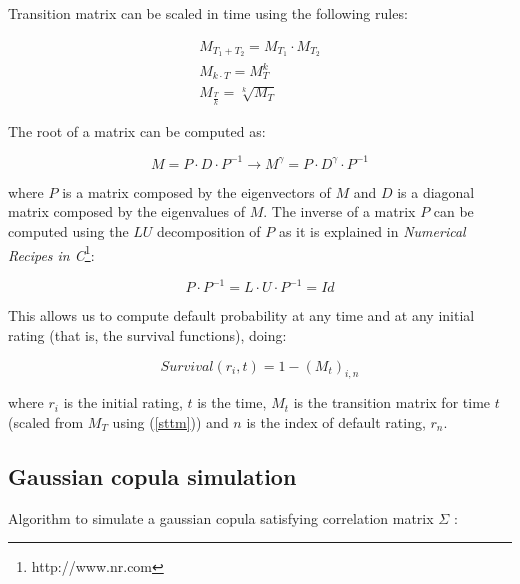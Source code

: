 \documentclass[a4paper,12pt,final]{article}
\begin{document}
Transition matrix can be scaled in time using the following rules:

\begin{equation}
\label{sttm}
\begin{array}{l}
M_{T_1+T_2} = M_{T_1} \cdot M_{T_2} \nonumber \\
M_{k \cdot T} = M_{T}^k \nonumber \\
M_{\frac{T}{k}} = \sqrt[k]{M_{T}} \nonumber
\end{array}
\end{equation}

The root of a matrix can be computed as:

\begin{displaymath}
M = P \cdot D \cdot P^{-1}
\longrightarrow
M^{\gamma} = P \cdot D^{\gamma} \cdot P^{-1}
\end{displaymath}

where $P$ is a matrix composed by the eigenvectors of $M$ and $D$ is a diagonal 
matrix composed by the eigenvalues of $M$. The inverse of a matrix $P$ can be 
computed using the $LU$ decomposition of $P$ as it is explained in \emph{Numerical 
Recipes in C}\footnote{http://www.nr.com}:

\begin{displaymath}
P \cdot P^{-1} = L \cdot U \cdot P^{-1} = Id
\end{displaymath}

This allows us to compute default probability at any time and at any initial 
rating (that is, the survival functions), doing:

\begin{displaymath}
Survival(r_i, t) = 1 - \left( M_t \right)_{i, n}
\end{displaymath}

where $r_i$ is the initial rating, $t$ is the time, $M_t$ is the transition 
matrix for time $t$ (scaled from $M_T$ using (\ref{sttm})) and $n$ is the 
index of default rating, $r_n$.

\subsection{Gaussian copula simulation}
\label{ap:gaussiancopu}
Algorithm to simulate a gaussian copula satisfying correlation matrix $\Sigma$ 
\cite{copu:wang} \cite{copu:pricing}:
\end{document}
